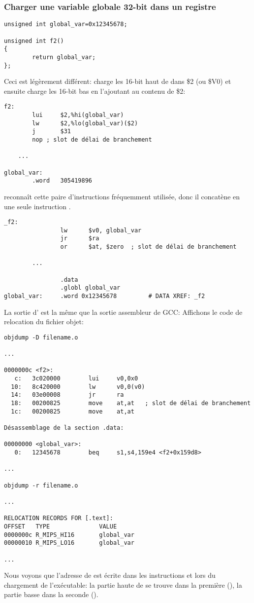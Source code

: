 \subsubsection{Charger une variable globale 32-bit dans un registre}

\begin{lstlisting}[style=customc]
unsigned int global_var=0x12345678;

unsigned int f2()
{
        return global_var;
};
\end{lstlisting}


Ceci est légèrement différent:  charge les 16-bit haut de 
dans \$2 (ou \$V0) et ensuite  charge les 16-bit bas en l'ajoutant au contenu
de \$2:

\begin{lstlisting}[caption=GCC 4.4.5 -O3 (\assemblyOutput),style=customasmMIPS]
f2:
        lui     $2,%hi(global_var)
        lw      $2,%lo(global_var)($2)
        j       $31
        nop	; slot de délai de branchement

	...

global_var:
        .word   305419896
\end{lstlisting}

\IDA reconnaît cette paire d'instructions fréquemment utilisée, donc il concatène en
une seule instruction .

\begin{lstlisting}[caption=GCC 4.4.5 -O3 (IDA),style=customasmMIPS]
_f2:
                lw      $v0, global_var
                jr      $ra
                or      $at, $zero	; slot de délai de branchement

		...

                .data
                .globl global_var
global_var:     .word 0x12345678         # DATA XREF: _f2
\end{lstlisting}

La sortie d' est la même que la sortie assembleur de GCC:
Affichons le code de relocation du fichier objet:

\begin{lstlisting}[caption=objdump,style=customasmMIPS]
objdump -D filename.o

...

0000000c <f2>:
   c:   3c020000        lui     v0,0x0
  10:   8c420000        lw      v0,0(v0)
  14:   03e00008        jr      ra
  18:   00200825        move    at,at	; slot de délai de branchement
  1c:   00200825        move    at,at

Désassemblage de la section .data:

00000000 <global_var>:
   0:   12345678        beq     s1,s4,159e4 <f2+0x159d8>

...

objdump -r filename.o

...

RELOCATION RECORDS FOR [.text]:
OFFSET   TYPE              VALUE
0000000c R_MIPS_HI16       global_var
00000010 R_MIPS_LO16       global_var

...

\end{lstlisting}

Nous voyons que l'adresse de  est écrite dans les instructions 
et  lors du chargement de l'exécutable:
la partie haute de  se trouve dans la première (), la partie
basse dans la seconde ().


